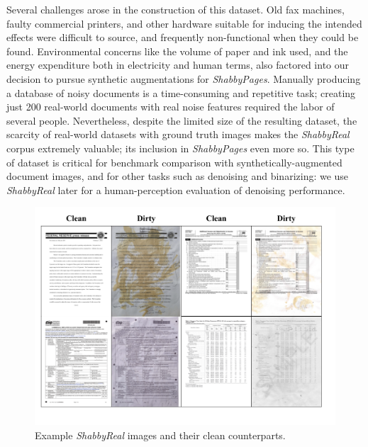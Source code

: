 \documentclass[runningheads]{llncs}
\begin{document}
Several challenges arose in the construction of this dataset.
Old fax machines, faulty commercial printers, and other hardware suitable for inducing the intended effects were difficult to source, and frequently non-functional when they could be found.
Environmental concerns like the volume of paper and ink used, and the energy expenditure both in electricity and human terms, also factored into our decision to pursue synthetic augmentations for \emph{ShabbyPages}.
Manually producing a database of noisy documents is a time-consuming and repetitive task; creating just 200 real-world documents with real noise features required the labor of several people.
Nevertheless, despite the limited size of the resulting dataset, the scarcity of real-world datasets with ground truth images makes the \emph{ShabbyReal} corpus extremely valuable; its inclusion in \emph{ShabbyPages} even more so.
This type of dataset is critical for benchmark comparison with synthetically-augmented document images, and for other tasks such as denoising and binarizing: we use \emph{ShabbyReal} later for a human-perception evaluation of denoising performance.

\begin{figure}
\centering
\includegraphics[width=0.98\columnwidth, frame]{figures/shabbyreal_figure1.png}
\caption{Example \emph{ShabbyReal} images and their clean counterparts.}
\label{fig:shabbyreal_sample}
\end{figure}
\end{document}
